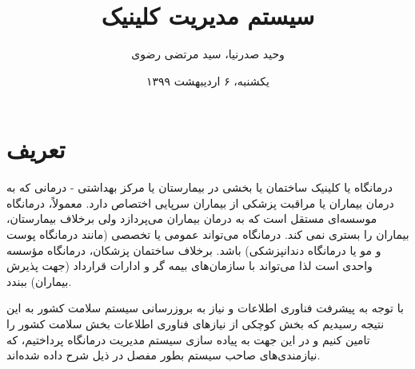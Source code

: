 \documentclass[a4paper,12pt]{article}
\begin{document}
	
	\renewcommand{\bibname}{مراجع}
	
	\title{
		سیستم مدیریت کلینیک
	}
	\author{
		وحید صدرنیا، سید مرتضی رضوی
	}
	\date{
		یکشنبه، ۶ اردیبهشت ۱۳۹۹
	}

	\maketitle
	\section*{تعریف}\label{chap13}
	
	درمانگاه یا کلینیک 
	ساختمان یا بخشی در بیمارستان یا مرکز بهداشتی - درمانی که به درمان بیماران یا مراقبت پزشکی از بیماران سرپایی اختصاص دارد. معمولاً، درمانگاه موسسه‌ای مستقل است که به درمان بیماران می‌پردازد ولی برخلاف بیمارستان، بیماران را بستری نمی کند. درمانگاه می‌تواند عمومی یا تخصصی (مانند درمانگاه پوست و مو یا درمانگاه دندانپزشکی) باشد. برخلاف ساختمان پزشکان، درمانگاه مؤسسه واحدی است لذا می‌تواند با سازمان‌های بیمه گر و ادارات قرارداد (جهت پذیرش بیماران) ببندد.
	
	با توجه به پیشرفت فناوری اطلاعات و نیاز به بروزرسانی سیستم سلامت کشور به این نتیجه رسیدیم که بخش کوچکی از نیازهای فناوری اطلاعات بخش سلامت کشور را تامین کنیم و در این جهت به  پیاده سازی سیستم مدیریت درمانگاه پرداختیم، که نیازمندی‌های صاحب سیستم بطور مفصل در ذیل شرح داده شده‌اند.
	
\end{document}
